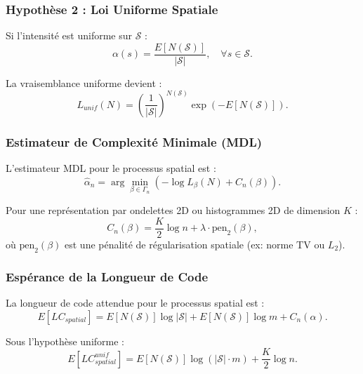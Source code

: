\documentclass[11pt,a4paper]{article}
\begin{document}
	\subsubsection{Hypothèse 2 : Loi Uniforme Spatiale}
	
	Si l'intensité est uniforme sur $\mathcal{S}$ :
	\begin{equation}
		\alpha(s) = \frac{E[N(\mathcal{S})]}{|\mathcal{S}|}, \quad \forall s \in \mathcal{S}.
	\end{equation}
	
	La vraisemblance uniforme devient :
	\begin{equation}
		L_{unif}(N) = \left( \frac{1}{|\mathcal{S}|} \right)^{N(\mathcal{S})} \exp\left( - E[N(\mathcal{S})] \right).
	\end{equation}
	
	\subsubsection{Estimateur de Complexité Minimale (MDL)}
	
	L'estimateur MDL pour le processus spatial est :
	\begin{equation}
		\hat{\alpha}_n = \arg \min_{\beta \in \Gamma_n} \left( -\log L_{\beta}(N) + C_n(\beta) \right).
	\end{equation}
	
	Pour une représentation par ondelettes 2D ou histogrammes 2D de dimension $K$ :
	\begin{equation}
		C_n(\beta) = \frac{K}{2} \log n + \lambda \cdot \text{pen}_2(\beta),
	\end{equation}
	où $\text{pen}_2(\beta)$ est une pénalité de régularisation spatiale (ex: norme TV ou $L_2$).
	
	\subsubsection{Espérance de la Longueur de Code}
	
	La longueur de code attendue pour le processus spatial est :
	\begin{equation}
		E[LC_{spatial}] = E[N(\mathcal{S})] \log |\mathcal{S}| + E[N(\mathcal{S})] \log m + C_n(\alpha).
	\end{equation}
	
	Sous l'hypothèse uniforme :
	\begin{equation}
		E[LC_{spatial}^{unif}] = E[N(\mathcal{S})] \log(|\mathcal{S}| \cdot m) + \frac{K}{2} \log n.
	\end{equation}
	
\end{document}
